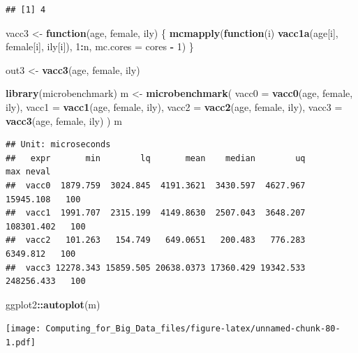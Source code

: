 \documentclass[]{book}
\newenvironment{Shaded}{\begin{snugshade}}{\end{snugshade}}
\newcommand{\KeywordTok}[1]{\textcolor[rgb]{0.13,0.29,0.53}{\textbf{#1}}}
\newcommand{\DataTypeTok}[1]{\textcolor[rgb]{0.13,0.29,0.53}{#1}}
\newcommand{\DecValTok}[1]{\textcolor[rgb]{0.00,0.00,0.81}{#1}}
\newcommand{\StringTok}[1]{\textcolor[rgb]{0.31,0.60,0.02}{#1}}
\newcommand{\ControlFlowTok}[1]{\textcolor[rgb]{0.13,0.29,0.53}{\textbf{#1}}}
\newcommand{\OperatorTok}[1]{\textcolor[rgb]{0.81,0.36,0.00}{\textbf{#1}}}
\newcommand{\NormalTok}[1]{#1}
\theoremstyle{definition}
\theoremstyle{definition}
\theoremstyle{definition}
\theoremstyle{remark}
\begin{document}
\begin{verbatim}
## [1] 4
\end{verbatim}

\begin{Shaded}
\begin{Highlighting}[]
\NormalTok{vacc3 <-}\StringTok{ }\ControlFlowTok{function}\NormalTok{(age, female, ily) \{}
  \KeywordTok{mcmapply}\NormalTok{(}\ControlFlowTok{function}\NormalTok{(i) }\KeywordTok{vacc1a}\NormalTok{(age[i], female[i], ily[i]), }\DecValTok{1}\OperatorTok{:}\NormalTok{n, }\DataTypeTok{mc.cores =}\NormalTok{ cores }\OperatorTok{-}\StringTok{ }\DecValTok{1}\NormalTok{)}
\NormalTok{\}}

\NormalTok{out3 <-}\StringTok{ }\KeywordTok{vacc3}\NormalTok{(age, female, ily)}
\end{Highlighting}
\end{Shaded}

\begin{Shaded}
\begin{Highlighting}[]
\KeywordTok{library}\NormalTok{(microbenchmark)}
\NormalTok{m <-}\StringTok{ }\KeywordTok{microbenchmark}\NormalTok{(}
  \DataTypeTok{vacc0 =} \KeywordTok{vacc0}\NormalTok{(age, female, ily),}
  \DataTypeTok{vacc1 =} \KeywordTok{vacc1}\NormalTok{(age, female, ily),}
  \DataTypeTok{vacc2 =} \KeywordTok{vacc2}\NormalTok{(age, female, ily),}
  \DataTypeTok{vacc3 =} \KeywordTok{vacc3}\NormalTok{(age, female, ily)}
\NormalTok{)}
\NormalTok{m}
\end{Highlighting}
\end{Shaded}

\begin{verbatim}
## Unit: microseconds
##   expr       min        lq       mean    median        uq        max neval
##  vacc0  1879.759  3024.845  4191.3621  3430.597  4627.967  15945.108   100
##  vacc1  1991.707  2315.199  4149.8630  2507.043  3648.207 108301.402   100
##  vacc2   101.263   154.749   649.0651   200.483   776.283   6349.812   100
##  vacc3 12278.343 15859.505 20638.0373 17360.429 19342.533 248256.433   100
\end{verbatim}

\begin{Shaded}
\begin{Highlighting}[]
\NormalTok{ggplot2}\OperatorTok{::}\KeywordTok{autoplot}\NormalTok{(m)}
\end{Highlighting}
\end{Shaded}

\texttt{[image: Computing\_for\_Big\_Data\_files/figure-latex/unnamed-chunk-80-1.pdf]}
\end{document}
